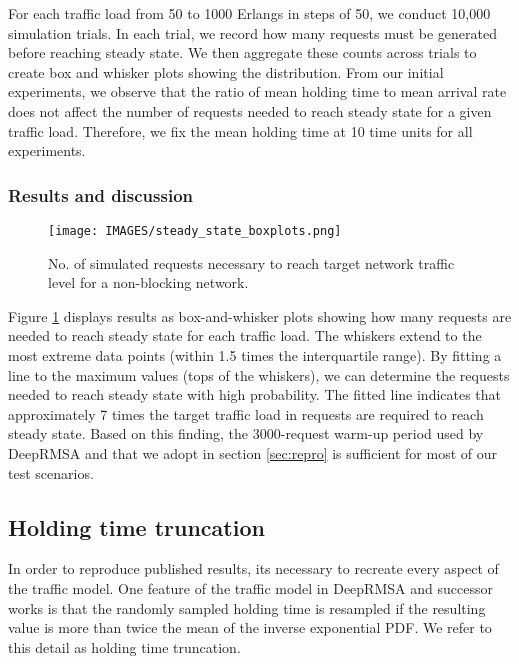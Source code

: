 For each traffic load from 50 to 1000 Erlangs in steps of 50, we conduct 10,000 simulation trials. In each trial, we record how many requests must be generated before reaching steady state. We then aggregate these counts across trials to create box and whisker plots showing the distribution. From our initial experiments, we observe that the ratio of mean holding time to mean arrival rate does not affect the number of requests needed to reach steady state for a given traffic load. Therefore, we fix the mean holding time at 10 time units for all experiments.


\subsubsection{Results and discussion}

\begin{figure}
    \centering
    \texttt{[image: IMAGES/steady\_state\_boxplots.png]}
    \caption{No. of simulated requests necessary to reach target network traffic level for a non-blocking network.}
    \label{fig:traffic_warmup}
\end{figure}

Figure \ref{fig:traffic_warmup} displays results as box-and-whisker plots showing how many requests are needed to reach steady state for each traffic load. The whiskers extend to the most extreme data points (within 1.5 times the interquartile range). By fitting a line to the maximum values (tops of the whiskers), we can determine the requests needed to reach steady state with high probability. The fitted line indicates that approximately 7 times the target traffic load in requests are required to reach steady state. Based on this finding, the 3000-request warm-up period used by DeepRMSA and that we adopt in section \ref{sec:repro} is sufficient for most of our test scenarios.










\subsection{Holding time truncation}
\label{sec:holding_time}

In order to reproduce published results, its necessary to recreate every aspect of the traffic model. One feature of the traffic model in DeepRMSA and successor works is that the randomly sampled holding time is resampled if the resulting value is more than twice the mean of the inverse exponential PDF. We refer to this detail as holding time truncation. 



